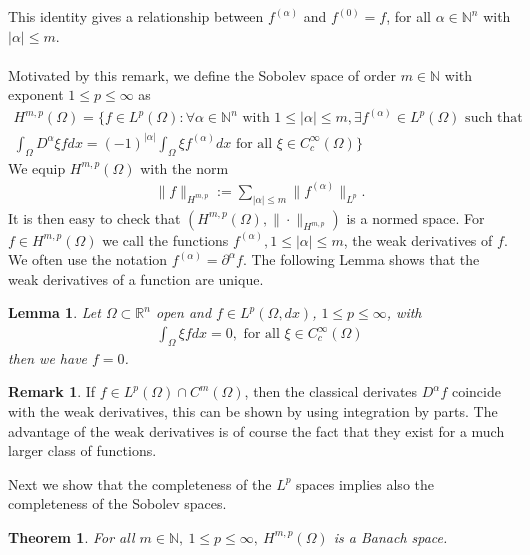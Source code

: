 \documentclass[11pt,a4paper]{article}
\newtheorem{lem}{Lemma}[section]
\newtheorem{thm}{Theorem}[section]
\theoremstyle{definition}
\newtheorem{rem}{Remark}[section]
\begin{document}
This identity gives a relationship between $f^{( \alpha)}$ and $f^{(0)}=f$, for all $\alpha \in \mathbb{N}^n$ with $| \alpha | \leq m$. \\
\\
Motivated by this remark, we define the Sobolev space of order $m \in \mathbb{N}$ with exponent $1 \leq p \leq \infty$ as 
\begin{align*}
H^{m,p}( \Omega) = \lbrace f \in L^p( \Omega) : \forall \alpha \in \mathbb{N}^n \text{ with } 1 \leq | \alpha | \leq m, \exists f^{( \alpha)} \in L^p( \Omega) \text{ such that } \\ \int_\Omega D^\alpha \xi f dx = (-1)^{| \alpha|} \int_\Omega \xi f^{( \alpha)} dx \text{ for all } \xi \in C_c^\infty ( \Omega) \rbrace
\end{align*}
We equip $H^{m,p}( \Omega)$ with the norm
\begin{align*}
\|f\|_{H^{m,p}} := \sum_{| \alpha| \leq m } \|f^{( \alpha)} \|_{L^p}.
\end{align*}
It is then easy to check that $(H^{m,p}( \Omega), \| \cdot \|_{H^{m,p}})$ is a normed space. For $f \in H^{m,p}( \Omega)$ we call the functions $f^{( \alpha)}, 1 \leq | \alpha | \leq m$, the weak derivatives of $f$. We often use the notation $f^{( \alpha)} = \partial^\alpha f$. The following Lemma shows that the weak derivatives of a function are unique.
\begin{lem} Let $\Omega \subset \mathbb{R}^n$ open and $f \in L^p( \Omega, dx)$, $1 \leq p \leq \infty$, with 
\begin{align*}
\int_\Omega \xi f dx =0, \text{ for all } \xi \in C_c^\infty( \Omega)
\end{align*}
then we have $f=0$. 
\end{lem}
\begin{rem} If $f \in L^p( \Omega) \cap C^m( \Omega)$, then the classical derivates $D^\alpha f$ coincide with the weak derivatives, this can be shown by using integration by parts. The advantage of the weak derivatives is of course the fact that they exist for a much larger class of functions.
\end{rem}
\noindent Next we show that the completeness of the $L^p$ spaces implies also the completeness of the Sobolev spaces. 
\newpage 
\begin{thm} For all $m \in \mathbb{N}, \ 1 \leq p \leq \infty, \ H^{m,p}( \Omega)$ is a Banach space. 
\end{thm} 
\end{document}
